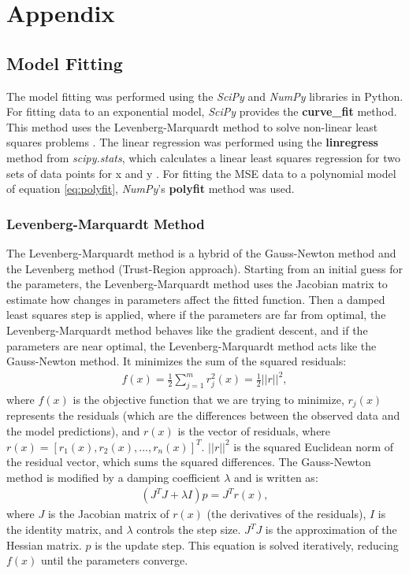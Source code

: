 \chapter{Appendix}\label{chap:appendix}
\section{Model Fitting}\label{sec:modelfitting}
The model fitting was performed using the \textit{SciPy} and \textit{NumPy} libraries in Python. For fitting data to an exponential model, \textit{SciPy} provides the \textbf{curve\_fit} method. This method uses the Levenberg-Marquardt method to solve non-linear least squares problems \cite{SciPyCurveFit}. The linear regression was performed using the \textbf{linregress} method from \textit{scipy.stats}, which calculates a linear least squares regression for two sets of data points for x and y \cite{SciPyLinRegress}. For fitting the MSE data to a polynomial model of equation \ref{eq:polyfit}, \textit{NumPy}'s \textbf{polyfit} method was used. 

\subsection{Levenberg-Marquardt Method}\label{subsec:lmMethod}
The Levenberg-Marquardt method is a hybrid of the Gauss-Newton method and the Levenberg method (Trust-Region approach). Starting from an initial guess for the parameters, the Levenberg-Marquardt method uses the Jacobian matrix to estimate how changes in parameters affect the fitted function. Then a damped least squares step is applied, where if the parameters are far from optimal, the Levenberg-Marquardt method behaves like the gradient descent, and if the parameters are near optimal, the Levenberg-Marquardt method acts like the Gauss-Newton method. It minimizes the sum of the squared residuals:
\begin{align}
    f(x)=\frac{1}{2}\sum_{j=1}^{m}{r_{j}^{2}(x)=\frac{1}{2}||r||^{2}},
\end{align}
where $f(x)$ is the objective function that we are trying to minimize, $r_{j}(x)$ represents the residuals (which are the differences between the observed data and the model predictions), and $r(x)$ is the vector of residuals, where $r(x)=[r_{1}(x), r_{2}(x),...,r_{n}(x)]^T$. $||r||^{2}$ is the squared Euclidean norm of the residual vector, which sums the squared differences. The Gauss-Newton method is modified by a damping coefficient $\lambda$ and is written as:
\begin{align}
    (J^{T}J+ \lambda I)p = J^{T}r(x),
\end{align}
where $J$ is the Jacobian matrix of $r(x)$ (the derivatives of the residuals), $I$ is the identity matrix, and $\lambda$ controls the step size. $J^{T}J$ is the approximation of the Hessian matrix. $p$ is the update step. This equation is solved iteratively, reducing $f(x)$ until the parameters converge.

